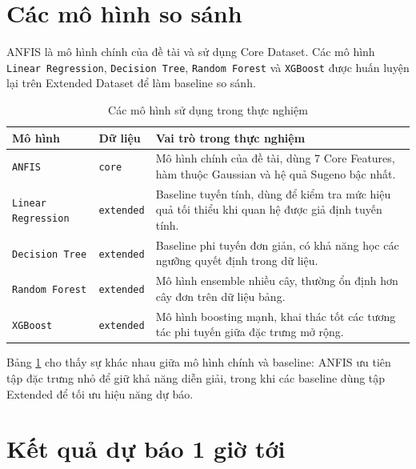 \section{Các mô hình so sánh}

ANFIS là mô hình chính của đề tài và sử dụng Core Dataset. Các mô hình \texttt{Linear Regression}, \texttt{Decision Tree}, \texttt{Random Forest} và \texttt{XGBoost} được huấn luyện lại trên Extended Dataset để làm baseline so sánh.

\begin{table}[H]
  \centering
  \caption{Các mô hình sử dụng trong thực nghiệm}
  \begin{tabularx}{\textwidth}{p{3.6cm} p{2.8cm} X}
    \toprule
    \textbf{Mô hình} & \textbf{Dữ liệu} & \textbf{Vai trò trong thực nghiệm} \\
    \midrule
    \texttt{ANFIS} & \texttt{core} & Mô hình chính của đề tài, dùng 7 Core Features, hàm thuộc Gaussian và hệ quả Sugeno bậc nhất. \\
    \texttt{Linear Regression} & \texttt{extended} & Baseline tuyến tính, dùng để kiểm tra mức hiệu quả tối thiểu khi quan hệ được giả định tuyến tính. \\
    \texttt{Decision Tree} & \texttt{extended} & Baseline phi tuyến đơn giản, có khả năng học các ngưỡng quyết định trong dữ liệu. \\
    \texttt{Random Forest} & \texttt{extended} & Mô hình ensemble nhiều cây, thường ổn định hơn cây đơn trên dữ liệu bảng. \\
    \texttt{XGBoost} & \texttt{extended} & Mô hình boosting mạnh, khai thác tốt các tương tác phi tuyến giữa đặc trưng mở rộng. \\
    \bottomrule
  \end{tabularx}
  \label{tab:models_used_final}
\end{table}

Bảng \ref{tab:models_used_final} cho thấy sự khác nhau giữa mô hình chính và baseline: ANFIS ưu tiên tập đặc trưng nhỏ để giữ khả năng diễn giải, trong khi các baseline dùng tập Extended để tối ưu hiệu năng dự báo.

\section{Kết quả dự báo 1 giờ tới}

